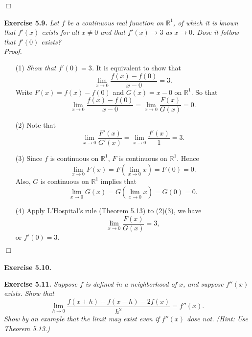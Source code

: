 \documentclass{article}
\begin{document}
$\Box$ \\\\






\textbf{Exercise 5.9.}
\emph{Let $f$ be a continuous real function on $\mathbb{R}^1$,
of which it is known that $f'(x)$ exists for all $x \neq 0$ and that $f'(x) \to 3$ as $x \to 0$.
Dose it follow that $f'(0)$ exists?} \\

\emph{Proof.}
\begin{enumerate}
  \item[(1)]
  \emph{Show that $f'(0) = 3$.}
  It is equivalent to show that
  \[
    \lim_{x \to 0} \frac{f(x) - f(0)}{x - 0} = 3.
  \]
  Write $F(x) = f(x) - f(0)$ and $G(x) = x - 0$ on $\mathbb{R}^1$.
  So that
  \[
    \lim_{x \to 0} \frac{f(x) - f(0)}{x - 0} = \lim_{x \to 0} \frac{F(x)}{G(x)} = 0.
  \]

  \item[(2)]
  Note that
    \[
      \lim_{x \to 0} \frac{F'(x)}{G'(x)}
      = \lim_{x \to 0} \frac{f'(x)}{1}
      = 3.
    \]

  \item[(3)]
  Since $f$ is continuous on $\mathbb{R}^1$,
  $F$ is continuous on $\mathbb{R}^1$.
  Hence
    \[
      \lim_{x \to 0} F(x) = F(\lim_{x \to 0} x) = F(0) = 0.
    \]
  Also, $G$ is continuous on $\mathbb{R}^1$ implies that
    \[
      \lim_{x \to 0} G(x) = G(\lim_{x \to 0} x) = G(0) = 0.
    \]

  \item[(4)]
  Apply L'Hospital's rule (Theorem 5.13) to (2)(3), we have
  \[
    \lim_{x \to 0} \frac{F(x)}{G(x)} = 3,
  \]
  or $f'(0) = 3$.
\end{enumerate}
$\Box$ \\\\






\textbf{Exercise 5.10.}






\textbf{Exercise 5.11.}
\emph{Suppose $f$ is defined in a neighborhood of $x$, and suppose $f''(x)$ exists.
Show that
\[
  \lim_{h \to 0}{\frac{f(x+h) + f(x-h) - 2f(x)}{h^2}} = f''(x).
\]
Show by an example that the limit may exist even if $f''(x)$ dose not.
(Hint: Use Theorem 5.13.)} \\
\end{document}
